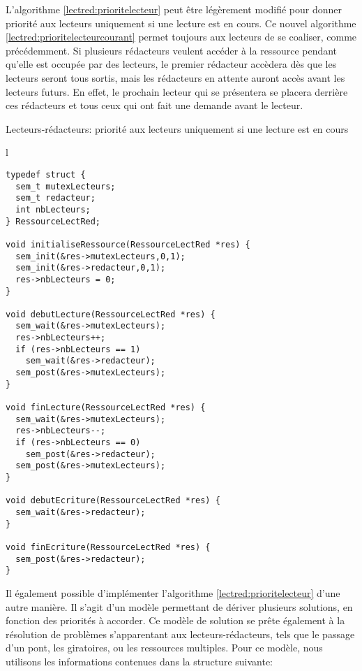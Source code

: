 L'algorithme \ref{lectred:prioritelecteur} peut être légèrement modifié pour donner priorité aux lecteurs uniquement si une lecture est en cours.
Ce nouvel algorithme \ref{lectred:prioritelecteurcourant} permet toujours aux lecteurs de se coaliser, comme précédemment. Si plusieurs rédacteurs veulent accéder à la ressource pendant qu'elle est occupée par des lecteurs, le premier rédacteur accèdera dès que les lecteurs seront tous sortis, mais les rédacteurs en attente auront accès avant les lecteurs futurs. En effet, le prochain lecteur qui se présentera se placera derrière ces rédacteurs et tous ceux qui ont fait une demande avant le lecteur.

\begin{algorithm}[h!tp]
\caption{Lecteurs-rédacteurs: priorité aux lecteurs uniquement si une lecture est en cours}\label{lectred:prioritelecteurcourant}
\centering
\begin{tabular}{l}
\lstset{language=C++}
\begin{lstlisting}
typedef struct {
  sem_t mutexLecteurs;
  sem_t redacteur;
  int nbLecteurs;
} RessourceLectRed;

void initialiseRessource(RessourceLectRed *res) {
  sem_init(&res->mutexLecteurs,0,1);
  sem_init(&res->redacteur,0,1);
  res->nbLecteurs = 0;
}

void debutLecture(RessourceLectRed *res) {
  sem_wait(&res->mutexLecteurs);
  res->nbLecteurs++;
  if (res->nbLecteurs == 1)
    sem_wait(&res->redacteur);
  sem_post(&res->mutexLecteurs);
}

void finLecture(RessourceLectRed *res) {
  sem_wait(&res->mutexLecteurs);
  res->nbLecteurs--;
  if (res->nbLecteurs == 0)
    sem_post(&res->redacteur);
  sem_post(&res->mutexLecteurs);
}

void debutEcriture(RessourceLectRed *res) {
  sem_wait(&res->redacteur);
}

void finEcriture(RessourceLectRed *res) {
  sem_post(&res->redacteur);
}
\end{lstlisting}
\end{tabular}

\end{algorithm}

Il également possible d'implémenter l'algorithme \ref{lectred:prioritelecteur} d'une autre manière. Il s'agit d'un modèle permettant de dériver plusieurs solutions, en fonction des priorités à accorder. Ce modèle de solution se prête également à la résolution de problèmes s'apparentant aux lecteurs-rédacteurs, tels que le passage d'un pont, les giratoires, ou les ressources multiples. Pour ce modèle, nous utilisons les informations contenues dans la structure suivante:

